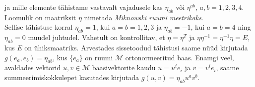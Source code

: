 \documentclass[a4paper,12pt]{article}
\theoremstyle{plain}
\theoremstyle{definition}
\numberwithin{equation}{section}
\def\M{{\mathcal M}}
\begin{document}
ja mille elemente tähistame vastavalt vajadusele kas $\eta_{ab}$ või $\eta^{ab}$, $a, b = 1, 2, 3, 4$. Loomulik on maatriksit $\eta$ nimetada \emph{Miknowski ruumi meetrikaks}.\\
Sellise tähistuse korral $\eta_{ab} = 1$, kui $a = b = 1, 2, 3$ ja $\eta_{ab} = -1$, kui $a = b = 4$ ning $\eta_{ab} = 0$ muudel juhtudel. Vahetult on kontrollitav, et $\eta = \eta^T$ ja $\eta \eta^{-1} = \eta^{-1} \eta = E$, kus $E$ on ühiksmaatriks.
\newline
Arvestades sissetoodud tähistusi saame nüüd kirjutada $g\left(e_a, e_b\right) = \eta_{ab}$, kus $\{e_a\}$ on ruumi $\M$ ortonormeeritud baas. Enamgi veel, avaldades vektorid $u, v \in \M$ baasivektorite kaudu $u = u^i e_i$ ja $v = v^i e_i$, saame summeerimiskokkulepet kasutades kirjutada $g \left(u, v\right) = \eta_{ab} u^a v^b$.
\end{document}
